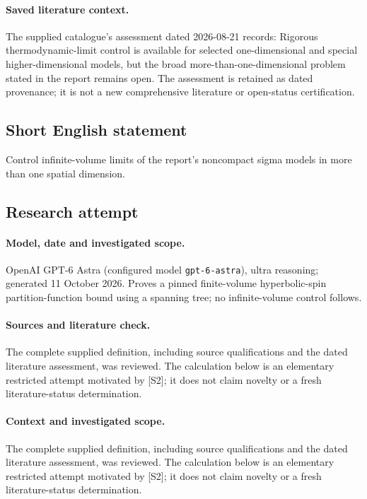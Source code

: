 \documentclass[11pt]{article}
\begin{document}
\paragraph{Saved literature context.} The supplied catalogue's assessment dated 2026-08-21 records: Rigorous thermodynamic-limit control is available for selected one-dimensional and special higher-dimensional models, but the broad more-than-one-dimensional problem stated in the report remains open. The assessment is retained as dated provenance; it is not a new comprehensive literature or open-status certification.
\subsection{Short English statement}
Control infinite-volume limits of the report's noncompact sigma models in more than one spatial dimension.
\subsection{Research attempt}
\paragraph{Model, date and investigated scope.}
OpenAI GPT-6 Astra (configured model \texttt{gpt-6-astra}), ultra reasoning; generated 11 October 2026. Proves a pinned finite-volume hyperbolic-spin partition-function bound using a spanning tree; no infinite-volume control follows.

\paragraph{Sources and literature check.}
The complete supplied definition, including source qualifications and the dated literature assessment, was reviewed. The calculation below is an elementary restricted attempt motivated by [S2]; it does not claim novelty or a fresh literature-status determination.

\paragraph{Context and investigated scope.} The complete supplied definition, including source qualifications and the dated literature assessment, was reviewed. The calculation below is an elementary restricted attempt motivated by [S2]; it does not claim novelty or a fresh literature-status determination.
\end{document}

